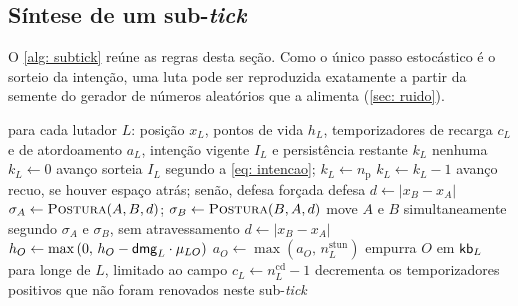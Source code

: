 \subsection{Síntese de um sub-\textit{tick}}
\label{sub: subtick}

O \autoref{alg: subtick} reúne as regras desta seção. Como o único passo estocástico é o sorteio da intenção, uma luta pode ser reproduzida exatamente a partir da semente do gerador de números aleatórios que a alimenta (\autoref{sec: ruido}).

\begin{algoritmo}[htb]
    \caption{Um sub-\textit{tick} do combate.}
    \label{alg: subtick}
    \begin{algorithmic}[1]
        \Require para cada lutador $L$: posição $x_L$, pontos de vida $h_L$, temporizadores de recarga $c_L$ e de atordoamento $a_L$, intenção vigente $I_L$ e persistência restante $k_L$
                \State \Return nenhuma 
                \State $k_L \gets 0$
                \State \Return avanço 
            \EndIf
                \State sorteia $I_L$ segundo a \autoref{eq: intencao}; \quad $k_L \gets n_{\mathrm{p}}$
            \EndIf
            \State $k_L \gets k_L - 1$
                \State \Return avanço
                \State \Return recuo, se houver espaço atrás; senão, defesa forçada
            \EndIf
            \State \Return defesa
        \EndFunction
        \Statex
        \State $d \gets |x_B - x_A|$
        \State $\sigma_A \gets \Call{Postura}{A, B, d}$; \quad $\sigma_B \gets \Call{Postura}{B, A, d}$
        \State move $A$ e $B$ simultaneamente segundo $\sigma_A$ e $\sigma_B$, sem atravessamento
        \State $d \gets |x_B - x_A|$ 
         
                \State $h_O \gets \max\left(0,\, h_O - \mathsf{dmg}_L \cdot \mu_{LO}\right)$ 
                \State $a_O \gets \max\left(a_O,\, n^{\mathrm{stun}}_L\right)$ 
                \State empurra $O$ em $\mathsf{kb}_L$ para longe de $L$, limitado ao campo
                \State $c_L \gets n^{\mathrm{cd}}_L - 1$ 
            \EndIf
        \EndFor
        \State decrementa os temporizadores positivos que não foram renovados neste sub-\textit{tick}
    \end{algorithmic}
    \source
\end{algoritmo}

